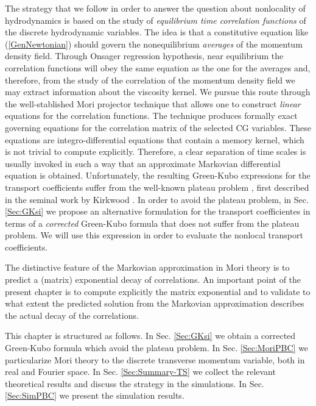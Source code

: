 \documentclass[b5paper,openright,10pt]{book}
\begin{document}
The strategy  that we follow in  order to answer
the question about nonlocality of hydrodynamics is based on the study
of  \textit{equilibrium time  correlation functions}  of the  discrete
hydrodynamic variables.  The idea is that a constitutive equation like
(\ref{GenNewtonian})     should     govern     the     nonequilibrium
\textit{averages}  of the  momentum  density  field.  Through  Onsager
regression hypothesis, near equilibrium the correlation functions will
obey the  same equation as  the one  for the averages  and, therefore,
from the study of the correlation of the momentum density field we may
extract information about the viscosity  kernel.  We pursue this route
through the  well-stablished Mori projector technique  that allows one
to construct \textit{linear} equations  for the correlation functions.
The  technique produces  formally  exact governing  equations for  the
correlation matrix of the selected  CG variables.  These equations are
integro-differential equations that contain  a memory kernel, which is
not trivial to  compute explicitly.  Therefore, a  clear separation of
time  scales is  usually invoked  in such  a way  that an  approximate
Markovian  differential  equation  is  obtained.   Unfortunately,  the
resulting Green-Kubo expressions for the transport coefficients suffer
from   the  well-known   plateau  problem   \cite{Espanol1992},  first
described in the seminal work by Kirkwood \cite{Kirkwood1949}. In order to avoid the plateau problem, in Sec. \ref{Sec:GKsi} we propose an alternative formulation for the transport coefficientes in terms of a  \textit{corrected} Green-Kubo formula that
does  not suffer  from the  plateau problem. We will use this expression  in order to evaluate the nonlocal
transport coefficients.

The distinctive feature of the  Markovian approximation in Mori theory
is  to  predict  a  (matrix) exponential  decay  of  correlations.  An
important  point of  the present chapter is  to compute  explicitly the
matrix  exponential  and to  validate  to  what extent  the  predicted
solution from  the Markovian approximation describes  the actual decay
of the correlations.

This chapter is structured as follows. 
In Sec. \ref{Sec:GKsi} we obtain a corrected Green-Kubo formula which avoid the plateau problem. 
In Sec. \ref{Sec:MoriPBC} we particularize Mori theory to the discrete transverse momentum variable, both in real and Fourier space. 
In  Sec.  \ref{Sec:Summary-TS}  we  collect  the relevant  theoretical
results  and  discuss  the  strategy  in  the  simulations.   In  Sec.
\ref{Sec:SimPBC}  we   present  the  simulation  results. 
\end{document}
